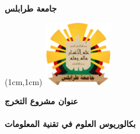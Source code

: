 \documentclass[a4paper,12pt]{book}
\begin{document}
	\color{black}
	

	\begin{titlepage}
		\begin{flushright}
			\fontsize{24}{24}\selectfont\textbf{\textarabic{جامعة طرابلس}}\\[10pt]
		\end{flushright}
		\hfill    
		\begin{textblock*}{3cm}(1cm,1cm)
			\includegraphics[width=3cm]{UOT_logo_transp.png}
		\end{textblock*}
		\vfill
		\begin{center}
			\fontsize{24}{24}\selectfont\textbf{\textarabic{عنوان مشروع التخرج}}\\[20pt]
			\fontsize{14}{14}\\[10pt]
			\vfill
			\fontsize{20}{20}\selectfont\textbf{\textarabic{بكالوريوس العلوم في تقنية المعلومات}}\\[10pt]
			\fontsize{14}{14}\\
		\end{center}
	\end{titlepage}
	
\end{document}
